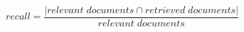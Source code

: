 \begin{equation}
  recall = \frac{|{relevant\;documents}\cap{retrieved\;documents}|}{{relevant\;documents}} 
\end{equation} 
